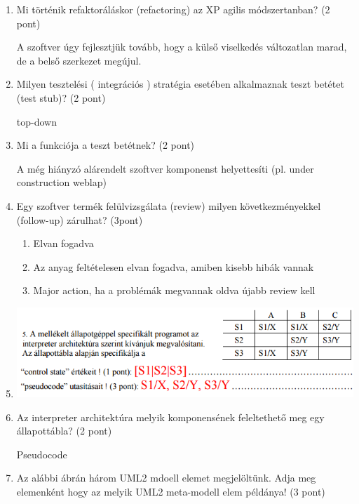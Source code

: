 \begin{enumerate}
	\item Mi történik refaktoráláskor (refactoring) az XP agilis módszertanban? (2 pont)

		A szoftver úgy fejlesztjük tovább, hogy a külső viselkedés változatlan marad, de a belső szerkezet megújul.

	\item Milyen tesztelési ( integrációs ) stratégia esetében alkalmaznak teszt betétet (test stub)? (2 pont)

	top-down

	\item Mi a funkciója a teszt betétnek? (2 pont)

	A még hiányzó alárendelt szoftver komponenst helyettesíti (pl. under construction weblap)

	\item Egy szoftver termék felülvizsgálata (review) milyen következményekkel (follow-up) zárulhat? (3pont)

		\begin{enumerate}
			\item Elvan fogadva
			\item Az anyag feltételesen elvan fogadva, amiben kisebb hibák vannak
			\item Major action, ha a problémák megvannak oldva újabb review kell
		\end{enumerate}


	\item

		\begin{center}
			\includegraphics[scale=0.7]{img/table19}
		\end{center}

	\item Az interpreter architektúra melyik komponensének feleltethető meg egy állapottábla? (2 pont)

		 Pseudocode

	\item Az alábbi ábrán három UML2 mdoell elemet megjelöltünk. Adja meg elemenként hogy az melyik UML2 meta-modell elem példánya! (3 pont)


\end{enumerate}

